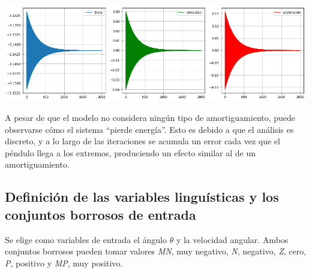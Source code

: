 \documentclass[onecolumn]{article}
\begin{document}
\includegraphics{output_8_0.png}

A pesar de que el modelo no considera ningún tipo de amortiguamiento,
puede observarse cómo el sistema ``pierde energía''. Esto es debido a
que el análisis es discreto, y a lo largo de las iteraciones se acumula
un error cada vez que el péndulo llega a los extremos, produciendo un
efecto similar al de un amortiguamiento.

\hypertarget{definiciuxf3n-de-las-variables-linguuxedsticas-y-los-conjuntos-borrosos-de-entrada}{%
\subsection{Definición de las variables linguísticas y los conjuntos
borrosos de
entrada}\label{definiciuxf3n-de-las-variables-linguuxedsticas-y-los-conjuntos-borrosos-de-entrada}}

Se elige como variables de entrada el ángulo \(\theta\) y la velocidad
angular. Ambos conjuntos borrosos pueden tomar valores \emph{MN}, muy
negativo, \emph{N}, negativo, \emph{Z}, cero, \emph{P}, positivo y
\emph{MP}, muy positivo.
\end{document}

